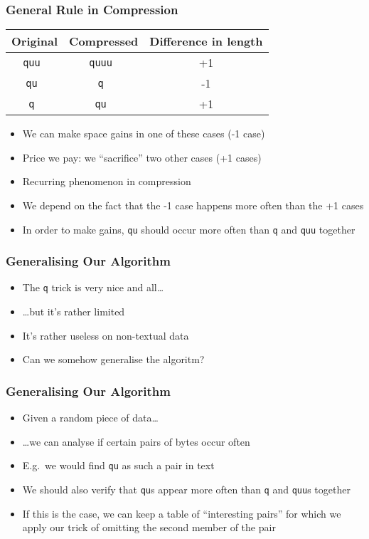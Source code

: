 \documentclass{../ucll-slides}
\begin{document}
\begin{frame}
  \frametitle{General Rule in Compression}
  \begin{center}
    \begin{tabular}{ccc}
      \bf Original & \bf Compressed & \bf Difference in length \\
      \toprule
      \tt quu & \tt quuu & +1 \\
      \tt qu & \tt q & -1 \\
      \tt q & \tt qu & +1 \\
    \end{tabular}
  \end{center}
  \begin{itemize}
    \item We can make space gains in one of these cases (-1 case)
    \item Price we pay: we ``sacrifice'' two other cases (+1 cases)
    \item Recurring phenomenon in compression
    \item We depend on the fact that the -1 case happens more often than the +1 cases
    \item In order to make gains, {\tt qu} should occur more often than {\tt q} and {\tt quu} together
  \end{itemize}
\end{frame}

\begin{frame}
  \frametitle{Generalising Our Algorithm}
  \begin{itemize}
    \item The {\tt q} trick is very nice and all\dots
    \item \dots but it's rather limited
    \item It's rather useless on non-textual data
    \item Can we somehow generalise the algoritm?
  \end{itemize}
\end{frame}

\begin{frame}
  \frametitle{Generalising Our Algorithm}
  \begin{itemize}
    \item Given a random piece of data\dots
    \item \dots we can analyse if certain pairs of bytes occur often
    \item E.g.\ we would find {\tt qu} as such a pair in text
    \item We should also verify that {\tt qu}s appear more often than {\tt q} and {\tt quu}s together
    \item If this is the case, we can keep a table of ``interesting pairs'' for which we apply our trick
          of omitting the second member of the pair
  \end{itemize}
\end{frame}
\end{document}
